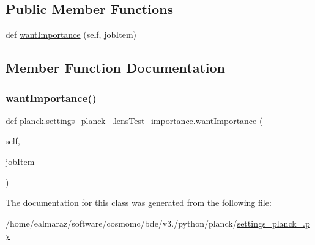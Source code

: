 \subsection*{Public Member Functions}
\begin{DoxyCompactItemize}
\item 
def \mbox{\hyperlink{classplanck_1_1settings__planck__2015_1_1lensTest__importance_ab0acab0427028d595f301a0aec347d49}{want\+Importance}} (self, job\+Item)
\end{DoxyCompactItemize}


\subsection{Member Function Documentation}
\mbox{\label{classplanck_1_1settings__planck__2015_1_1lensTest__importance_ab0acab0427028d595f301a0aec347d49}} 
\subsubsection{\texorpdfstring{want\+Importance()}{wantImportance()}}
{\footnotesize\ttfamily def planck.\+settings\+\_\+planck\+\_.\+lens\+Test\+\_\+importance.\+want\+Importance (\begin{DoxyParamCaption}\item[{}]{self,  }\item[{}]{job\+Item }\end{DoxyParamCaption})}



The documentation for this class was generated from the following file\+:\begin{DoxyCompactItemize}
\item 
/home/ealmaraz/software/cosmomc/bde/v3./python/planck/\mbox{\hyperlink{settings__planck__2015_8py}{settings\+\_\+planck\+\_.\+py}}\end{DoxyCompactItemize}
